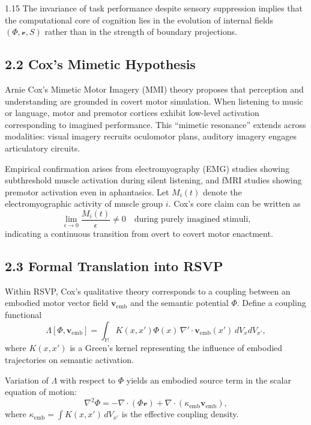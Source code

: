\documentclass[12pt,a4paper]{article}
\begin{document}
\begin{spacing}{1.15}
The invariance of task performance despite sensory suppression implies that the computational core of cognition lies in the evolution of internal fields \((\Phi, \boldsymbol{\mathcal{v}}, S)\) rather than in the strength of boundary projections.

\subsection{2.2 Cox’s Mimetic Hypothesis}

Arnie Cox’s Mimetic Motor Imagery (MMI) theory \cite{cox2001,cox2016} proposes that perception and understanding are grounded in covert motor simulation.  
When listening to music or language, motor and premotor cortices exhibit low-level activation corresponding to imagined performance.  
This “mimetic resonance” extends across modalities: visual imagery recruits oculomotor plans, auditory imagery engages articulatory circuits.

Empirical confirmation arises from electromyography (EMG) studies showing subthreshold muscle activation during silent listening, and fMRI studies showing premotor activation even in aphantasics.  
Let \(M_i(t)\) denote the electromyographic activity of muscle group \(i\).  
Cox’s core claim can be written as
\[
\lim_{\epsilon\to0} \frac{M_i(t)}{\epsilon} \neq 0
\quad \text{during purely imagined stimuli,}
\]
indicating a continuous transition from overt to covert motor enactment.

\subsection{2.3 Formal Translation into RSVP}

Within RSVP, Cox’s qualitative theory corresponds to a coupling between an embodied motor vector field \(\boldsymbol{v}_{\mathrm{emb}}\) and the semantic potential \(\Phi\).  
Define a coupling functional
\begin{equation}
\Lambda[\Phi,\boldsymbol{v}_{\mathrm{emb}}]
  = \int_{\mathbb{M}} 
    K(x,x') \Phi(x)\, \nabla'\!\cdot \boldsymbol{v}_{\mathrm{emb}}(x')\, dV_x dV_{x'},
\label{eq:lambda}
\end{equation}
where \(K(x,x')\) is a Green’s kernel representing the influence of embodied trajectories on semantic activation.

\begin{proposition}
Variation of \(\Lambda\) with respect to \(\Phi\) yields an embodied source term in the scalar equation of motion:
\[
\nabla^2 \Phi = - \nabla\!\cdot(\Phi \boldsymbol{\mathcal{v}}) + \nabla\!\cdot(\kappa_{\mathrm{emb}}\boldsymbol{v}_{\mathrm{emb}}),
\]
where \(\kappa_{\mathrm{emb}} = \int K(x,x')\, dV_{x'}\) is the effective coupling density.
\]
\end{proposition}


\end{spacing}
\end{document}
